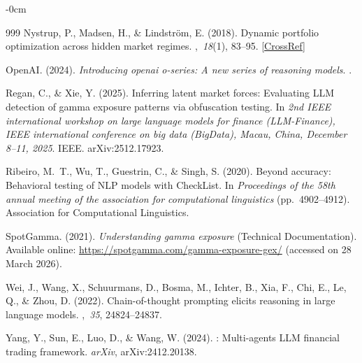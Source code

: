 \documentclass[jrfm,article,accept,moreauthors,pdftex]{Definitions/mdpi}
\begin{document}
\begin{adjustwidth}{-\extralength}{0cm}
\begin{thebibliography}{999}
Nystrup, P., Madsen, H.,  \& Lindstr{\"o}m, E. (2018).
\newblock Dynamic portfolio optimization across hidden market regimes.
,~{\em 18\/}(1), 83--95. [\href{http://dx.doi.org/10.1080/14697688.2017.1342857}{CrossRef}]

{OpenAI}. (2024).
\newblock \textit{Introducing openai o-series: A new series of reasoning models}.
.

Regan, C., \& Xie, Y. (2025).
\newblock Inferring latent market forces: Evaluating {LLM} detection of gamma
exposure patterns via obfuscation testing.
\newblock In {\em 2nd IEEE international workshop on large language models for
finance (LLM-Finance), IEEE international conference on big data (BigData),
Macau, China, December 8--11, 2025}. {IEEE.} arXiv:2512.17923.

Ribeiro, M.~T., Wu, T., Guestrin, C., \& Singh, S. (2020).
\newblock Beyond accuracy: Behavioral testing of {NLP} models with {CheckList}.
\newblock In {\em Proceedings of the 58th annual meeting of the association for
computational linguistics} (pp.\  4902--4912).  {Association for Computational Linguistics.}

{SpotGamma}. (2021).
\newblock \textit{Understanding gamma exposure} {(Technical Documentation).}  Available online:  \url{https://spotgamma.com/gamma-exposure-gex/} (accessed on 28 March 2026).

Wei, J., Wang, X., Schuurmans, D., Bosma, M., Ichter, B., Xia, F., Chi, E., Le, Q., \& Zhou, D. (2022).
\newblock Chain-of-thought prompting elicits reasoning in large language
models.
,~{\em 35},
24824--24837.

Yang, Y., Sun, E., Luo, D., \& Wang, W. (2024).
: Multi-agents {LLM} financial trading framework.
\newblock \textit{arXiv}, arXiv:2412.20138.



\end{thebibliography}

\PublishersNote{}
\end{adjustwidth}
\end{document}
